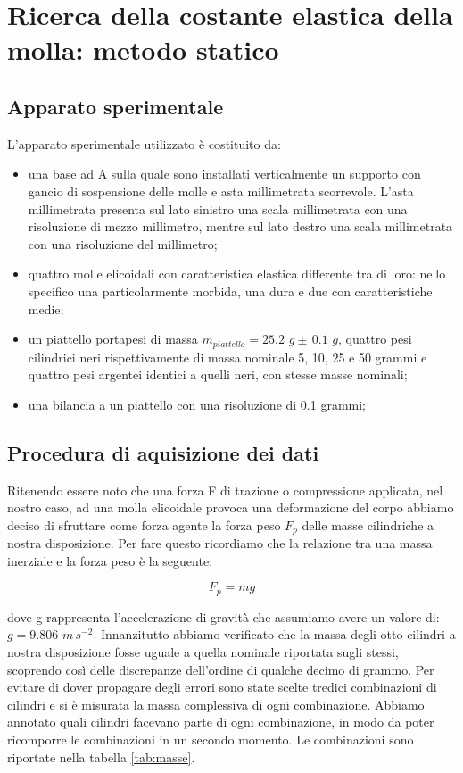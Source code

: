 \section{Ricerca della costante elastica della molla: metodo statico}

\subsection{Apparato sperimentale}
L'apparato sperimentale utilizzato è costituito da:
	\begin{itemize}
		\item{una base ad A sulla quale sono installati verticalmente un supporto con gancio di sospensione delle molle e asta millimetrata scorrevole. L'asta millimetrata presenta sul lato sinistro una scala millimetrata con una risoluzione di mezzo millimetro, mentre sul lato destro una scala millimetrata con una risoluzione del millimetro;}
		\item{quattro molle elicoidali con caratteristica elastica differente tra di loro: nello specifico una particolarmente morbida, una dura e due con caratteristiche medie;}
		\item{un piattello portapesi di massa $m_{piattello} = 25.2\,\,g \pm\, 0.1\,\,g$, quattro pesi cilindrici neri rispettivamente di massa nominale 5, 10, 25 e 50 grammi e quattro pesi argentei identici a quelli neri, con stesse masse nominali;}
		\item{una bilancia a un piattello con una risoluzione di 0.1 grammi;}
	\end{itemize}

\subsection{Procedura di aquisizione dei dati}

Ritenendo essere noto che una forza F di trazione o compressione applicata, nel nostro caso, ad una molla elicoidale provoca una deformazione del corpo abbiamo deciso di sfruttare come forza agente la forza peso $F_{p}$ delle masse cilindriche a nostra disposizione. Per fare questo ricordiamo che la relazione tra una massa inerziale e la forza peso è la seguente:

\begin{equation}
	F_{p} = mg
\end{equation}

dove g rappresenta l'accelerazione di gravità che assumiamo avere un valore di: $g = 9.806\,\,m\,s^{-2}$.
Innanzitutto abbiamo verificato che la massa degli otto cilindri a nostra disposizione fosse uguale a quella nominale riportata sugli stessi, scoprendo così delle discrepanze dell'ordine di qualche decimo di grammo. Per evitare di dover propagare degli errori sono state scelte tredici combinazioni di cilindri e si è misurata la massa complessiva di ogni combinazione. Abbiamo annotato quali cilindri facevano parte di ogni combinazione, in modo da poter ricomporre le combinazioni in un secondo momento. Le combinazioni sono riportate nella tabella \ref{tab:masse}.

